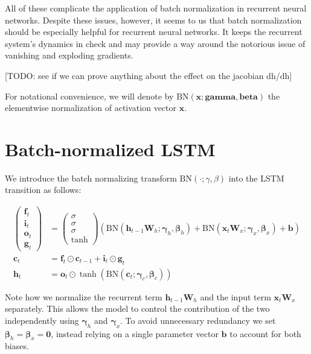 \documentclass{article} %
\newcommand{\vect}[1]{\mathbf{#1}}
\newcommand{\mat}[1]{\mathbf{#1}}
\newcommand{\ewprod}{\odot}
\begin{document}
All of these complicate the application of batch normalization in recurrent neural networks.
Despite these issues, however, it seems to us that batch normalization should be especially helpful for recurrent neural networks.
It keeps the recurrent system's dynamics in check and may provide a way around the notorious issue of vanishing and exploding gradients.

[TODO: see if we can prove anything about the effect on the jacobian dh/dh]

For notational convenience, we will denote by $\mathrm{BN}(\vect{x}; \vect{gamma}, \vect{beta})$ the elementwise normalization of activation vector $\vect{x}$.

\section{Batch-normalized LSTM}

We introduce the batch normalizing transform $\mathrm{BN}(\cdot; \gamma, \beta)$ into the LSTM transition as follows:

\begin{align}
\left(\begin{array}{ccc}
\vect{f}_t \\
\vect{i}_t \\
\vect{o}_t \\
\vect{g}_t
\end{array}\right)
 &=
\left(\begin{array}{ccc}
\sigma \\
\sigma \\
\sigma \\
\tanh
\end{array}\right)
\left(
 \mathrm{BN} (\vect{h}_{t-1} \mat{W}_h; \vect{\gamma}_h, \vect{\beta}_h) +
 \mathrm{BN} (\vect{x}_t    \mat{W}_x; \vect{\gamma}_x, \vect{\beta}_x) +
 \vect{b}
\right) \\
\vect{c}_t &= \vect{f}_t \ewprod \vect{c}_{t-1} +
              \vect{i}_t \ewprod \vect{g}_t \\
\vect{h}_t &= \vect{o}_t \ewprod \tanh(
 \mathrm{BN} (\vect{c}_t; \vect{\gamma}_c, \vect{\beta}_c)
)
\end{align}

Note how we normalize the recurrent term $\vect{h}_{t-1} \mat{W}_h$ and the input term $\vect{x}_t \mat{W}_x$ separately.
This allows the model to control the contribution of the two independently using $\vect{\gamma}_h$ and $\vect{\gamma}_x$.
To avoid unnecessary redundancy we set $\vect{\beta}_h = \vect{\beta}_x = \vect{0}$, instead relying on a single parameter vector $\vect{b}$ to account for both biases.
\end{document}
